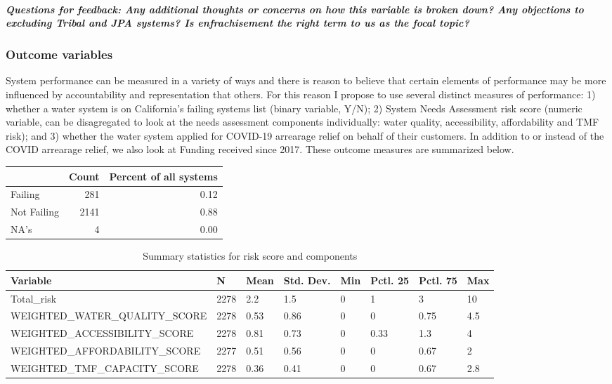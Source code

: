 \documentclass[
]{article}
\begin{document}
\hypertarget{questions-for-feedback-any-additional-thoughts-or-concerns-on-how-this-variable-is-broken-down-any-objections-to-excluding-tribal-and-jpa-systems-is-enfrachisement-the-right-term-to-us-as-the-focal-topic}{%
\subparagraph{Questions for feedback: Any additional thoughts or
concerns on how this variable is broken down? Any objections to
excluding Tribal and JPA systems? Is enfrachisement the right term to us
as the focal
topic?}\label{questions-for-feedback-any-additional-thoughts-or-concerns-on-how-this-variable-is-broken-down-any-objections-to-excluding-tribal-and-jpa-systems-is-enfrachisement-the-right-term-to-us-as-the-focal-topic}}

\hypertarget{outcome-variables}{%
\subsubsection{Outcome variables}\label{outcome-variables}}

System performance can be measured in a variety of ways and there is
reason to believe that certain elements of performance may be more
influenced by accountability and representation that others. For this
reason I propose to use several distinct measures of performance: 1)
whether a water system is on California's failing systems list (binary
variable, Y/N); 2) System Needs Assessment risk score (numeric variable,
can be disagregated to look at the needs assessment components
individually: water quality, accessibility, affordability and TMF risk);
and 3) whether the water system applied for COVID-19 arrearage relief on
behalf of their customers. In addition to or instead of the COVID
arrearage relief, we also look at Funding received since 2017. These
outcome measures are summarized below.

\begin{tabular}{l|r|r}
\hline
  & Count & Percent of all systems\\
\hline
Failing & 281 & 0.12\\
\hline
Not Failing & 2141 & 0.88\\
\hline
NA's & 4 & 0.00\\
\hline
\end{tabular}

\begin{table}

\caption{\label{tab:tabular overview of DVs}Summary statistics for risk score and components}
\centering
\begin{tabular}[t]{llllllll}
\toprule
Variable & N & Mean & Std. Dev. & Min & Pctl. 25 & Pctl. 75 & Max\\
\midrule
Total_risk & 2278 & 2.2 & 1.5 & 0 & 1 & 3 & 10\\
WEIGHTED_WATER_QUALITY_SCORE & 2278 & 0.53 & 0.86 & 0 & 0 & 0.75 & 4.5\\
WEIGHTED_ACCESSIBILITY_SCORE & 2278 & 0.81 & 0.73 & 0 & 0.33 & 1.3 & 4\\
WEIGHTED_AFFORDABILITY_SCORE & 2277 & 0.51 & 0.56 & 0 & 0 & 0.67 & 2\\
WEIGHTED_TMF_CAPACITY_SCORE & 2278 & 0.36 & 0.41 & 0 & 0 & 0.67 & 2.8\\
\bottomrule
\end{tabular}
\end{table}
\end{document}
